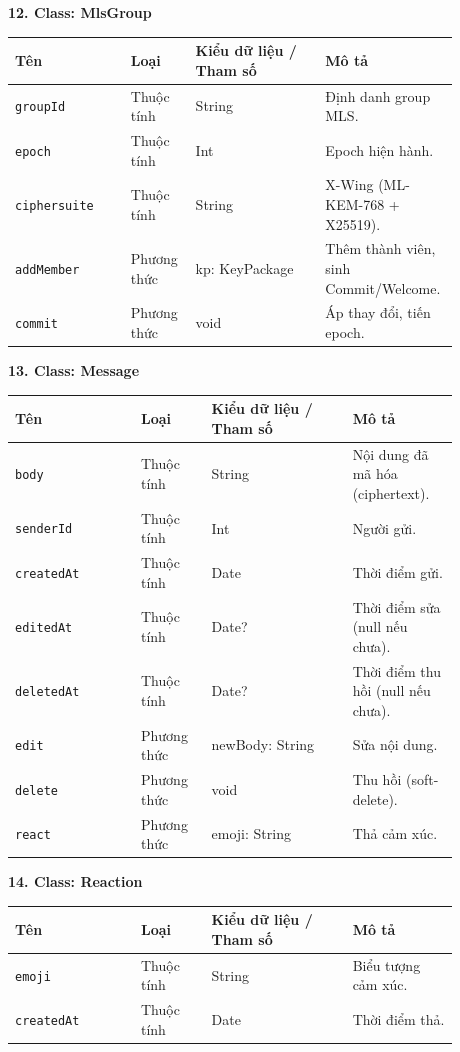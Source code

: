 \textbf{12. Class: MlsGroup}

{\small
\begin{longtable}{|p{0.25\linewidth}|p{0.14\linewidth}|p{0.28\linewidth}|p{0.21\linewidth}|}
\hline
\textbf{Tên} & \textbf{Loại} & \textbf{Kiểu dữ liệu / Tham số} & \textbf{Mô tả} \\ \hline
\endhead
\texttt{groupId} & Thuộc tính & String & Định danh group MLS. \\ \hline
\texttt{epoch} & Thuộc tính & Int & Epoch hiện hành. \\ \hline
\texttt{ciphersuite} & Thuộc tính & String & X-Wing (ML-KEM-768 + X25519). \\ \hline
\texttt{addMember} & Phương thức & kp: KeyPackage & Thêm thành viên, sinh Commit/Welcome. \\ \hline
\texttt{commit} & Phương thức & void & Áp thay đổi, tiến epoch. \\ \hline
\end{longtable}
}

\textbf{13. Class: Message}

{\small
\begin{longtable}{|p{0.25\linewidth}|p{0.14\linewidth}|p{0.28\linewidth}|p{0.21\linewidth}|}
\hline
\textbf{Tên} & \textbf{Loại} & \textbf{Kiểu dữ liệu / Tham số} & \textbf{Mô tả} \\ \hline
\endhead
\texttt{body} & Thuộc tính & String & Nội dung đã mã hóa (ciphertext). \\ \hline
\texttt{senderId} & Thuộc tính & Int & Người gửi. \\ \hline
\texttt{createdAt} & Thuộc tính & Date & Thời điểm gửi. \\ \hline
\texttt{editedAt} & Thuộc tính & Date? & Thời điểm sửa (null nếu chưa). \\ \hline
\texttt{deletedAt} & Thuộc tính & Date? & Thời điểm thu hồi (null nếu chưa). \\ \hline
\texttt{edit} & Phương thức & newBody: String & Sửa nội dung. \\ \hline
\texttt{delete} & Phương thức & void & Thu hồi (soft-delete). \\ \hline
\texttt{react} & Phương thức & emoji: String & Thả cảm xúc. \\ \hline
\end{longtable}
}

\textbf{14. Class: Reaction}

{\small
\begin{longtable}{|p{0.25\linewidth}|p{0.14\linewidth}|p{0.28\linewidth}|p{0.21\linewidth}|}
\hline
\textbf{Tên} & \textbf{Loại} & \textbf{Kiểu dữ liệu / Tham số} & \textbf{Mô tả} \\ \hline
\endhead
\texttt{emoji} & Thuộc tính & String & Biểu tượng cảm xúc. \\ \hline
\texttt{createdAt} & Thuộc tính & Date & Thời điểm thả. \\ \hline
\end{longtable}
}

